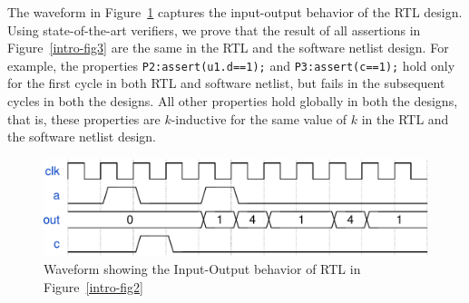 The waveform in Figure~\ref{intro-waveform} captures the input-output behavior of the RTL design. 
Using state-of-the-art verifiers, we prove that the result of all assertions 
in Figure~\ref{intro-fig3} are the same in the RTL and the software netlist design. 
%
For example, the properties \texttt{P2:assert(u1.d==1);} and \texttt{P3:assert(c==1);} 
hold only for the first cycle in both RTL and software netlist, but fails in the 
subsequent cycles in both the designs.  All other properties 
hold globally in both the designs, that is, these properties are $k$-inductive 
for the same value of $k$ in the RTL and the software netlist design.
%
\begin{figure} 
\begin{center}
  \includegraphics[width=\columnwidth]{figures/example/waveform1.pdf}%
	\caption{Waveform showing the Input-Output behavior of RTL in Figure~\ref{intro-fig2}}
\label{intro-waveform}
\end{center}
\end{figure}
%
